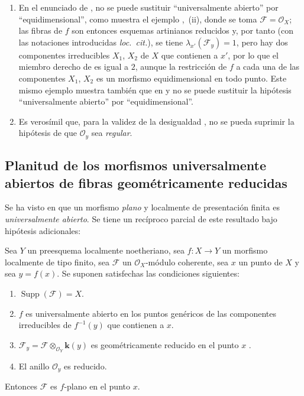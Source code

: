 \begin{remarks}[15.1.4]
\label{IV.15.1.4}
\begin{enumerate}[label=(\roman*)]
  \item En el enunciado de , no se puede sustituir ``universalmente abierto'' por ``equidimensional'', como muestra el ejemplo ,~(ii), donde se toma $\mathcal F=\mathcal O_X$; las fibras de $f$ son entonces esquemas artinianos reducidos y, por tanto (con las notaciones introducidas \emph{loc.\ cit.}), se tiene $\lambda_{x'}(\mathcal F_y)=1$, pero hay dos componentes irreducibles $X_1$, $X_2$ de $X$ que contienen a $x'$, por lo que el miembro derecho de  es igual a $2$, aunque la restricción de $f$ a cada una de las componentes $X_1$, $X_2$ es un morfismo equidimensional en todo punto.
Este mismo ejemplo muestra también que en  y  no se puede sustituir la hipótesis ``universalmente abierto'' por ``equidimensional''.
  \item Es verosímil que, para la validez de la desigualdad , no se pueda suprimir la hipótesis de que $\mathcal O_y$ sea \emph{regular}.
\end{enumerate}
\end{remarks}

\subsection{Planitud de los morfismos universalmente abiertos de fibras geométricamente reducidas}
\label{subsection:IV.15.2}

\begin{env}[15.2.1]
\label{IV.15.2.1}
Se ha visto en  que un morfismo \emph{plano} y localmente de presentación finita es \emph{universalmente abierto}.
Se tiene un recíproco parcial de este resultado bajo hipótesis adicionales:
\end{env}

\begin{theorem}[15.2.2]
\label{IV.15.2.2}
Sea $Y$ un preesquema localmente noetheriano, sea $f:X\to Y$ un morfismo localmente de tipo finito, sea $\mathcal F$ un $\mathcal O_X$-módulo coherente, sea $x$ un punto de $X$ y sea $y=f(x)$.
Se suponen satisfechas las condiciones siguientes:
\begin{enumerate}[label=\textup{(\roman*)}]
  \item $\operatorname{Supp}(\mathcal F)=X$.
  \item $f$ es universalmente abierto en los puntos genéricos de las componentes irreducibles de $f^{-1}(y)$ que contienen a $x$.
  \item $\mathcal F_y=\mathcal F\otimes_{\mathcal O_Y}\boldsymbol{k}(y)$ es geométricamente reducido en el punto $x$ .
  \item El anillo $\mathcal O_y$ es reducido.
\end{enumerate}
Entonces $\mathcal F$ es $f$-plano en el punto $x$.
\end{theorem}

